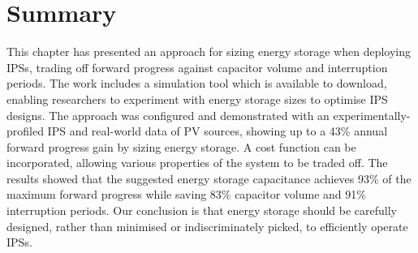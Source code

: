 \section{Summary} \label{sec:c4_summary}

This chapter has presented an approach for sizing energy storage when deploying IPSs, trading off forward progress against capacitor volume and interruption periods. 
The work includes a simulation tool which is available to download, enabling researchers to experiment with energy storage sizes to optimise IPS designs. 
The approach was configured and demonstrated with an experimentally-profiled IPS and real-world data of PV sources, showing up to a 43\% annual forward progress gain by sizing energy storage. 
A cost function can be incorporated, allowing various properties of the system to be traded off. 
The results showed that the suggested energy storage capacitance achieves 93\% of the maximum forward progress while saving 83\% capacitor volume and 91\% interruption periods. 
Our conclusion is that energy storage should be carefully designed, rather than minimised or indiscriminately picked, to efficiently operate IPSs. 
